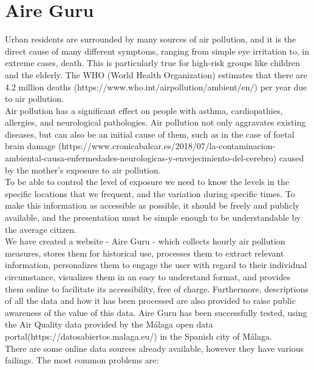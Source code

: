 \section{Aire Guru}

Urban residents are surrounded by many sources of air pollution, and it is the direct cause of many different symptoms, ranging from simple eye irritation to, in extreme cases, death.
This is particularly true for high-risk groups like children and the elderly.
The WHO (World Health Organization) estimates that there are 4.2 million deaths (https://www.who.int/airpollution/ambient/en/) per year due to air pollution.\\

Air pollution has a significant effect on people with asthma, cardiopathies, allergies, and neurological pathologies.
Air pollution not only aggravates existing diseases, but can also be an initial cause of them, such as in the case of foetal brain damage
(https://www.cronicabalear.es/2018/07/la-contaminacion-ambiental-causa-enfermedades-neurologicas-y-envejecimiento-del-cerebro)
caused by the mother's exposure to air pollution.\\

To be able to control the level of exposure we need to know the levels in the specific locations that we frequent, and the variation during specific times.
To make this information as accessible as possible, it should be freely and publicly available, and the presentation must be simple enough to be understandable by the average citizen.\\

We have created a website - Aire Guru - which collects hourly air pollution measures, stores them for historical use, 
processes them to extract relevant information, personalizes them to engage the user with regard to their individual
circumstance, visualizes them in an easy to understand format, and provides them online to facilitate its accessibility, free of charge.
Furthermore, descriptions of all the data and how it has been processed are also provided to raise public awareness of the value of this data.
Aire Guru has been successfully tested, using the Air Quality data provided by the Málaga open data portal(https://datosabiertos.malaga.eu/) in the Spanish city of Málaga.\\

There are some online data sources already available, however they have various failings.
The most common problems are:

